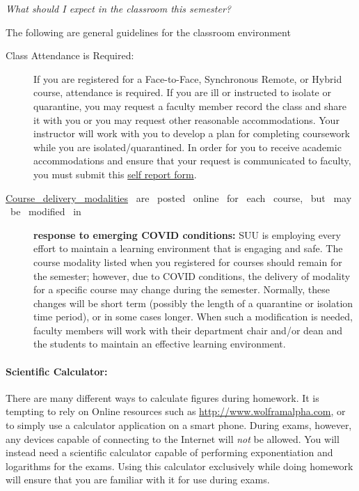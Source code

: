 \documentclass[12pt, letterpaper]{article}
\begin{document}
\noindent\emph{What should I expect in the classroom this semester?}

\noindent The following are general guidelines for the classroom environment
\begin{description}
	\item[Class Attendance is Required:] If you are registered for a Face-to-Face, Synchronous Remote, or Hybrid course, attendance is required. If you are ill or instructed to isolate or quarantine, you may request a faculty member record the class and share it with you or you may request other reasonable accommodations. Your instructor will work with you to develop a plan for completing coursework while you are isolated/quarantined. In order for you to receive academic accommodations and ensure that your request is communicated to faculty, you must submit this \href{https://my.suu.edu/covid/selfreport/}{self report form}.
	\item[\href{https://www.suu.edu/registrar/onlinehybrid.html}{Course ~delivery ~modalities} ~are ~posted ~online ~for ~each ~course, ~but ~may ~be ~modified ~in] \textbf{response to emerging COVID conditions:} SUU is employing every effort to maintain a learning environment that is engaging and safe. The course modality listed when you registered for courses should remain for the semester; however, due to COVID conditions, the delivery of modality for a specific course may change during the semester. Normally, these changes will be short term (possibly the length of a quarantine or isolation time period), or in some cases longer. When such a modification is needed, faculty members will work with their department chair and/or dean and the students to maintain an effective learning environment.
\end{description}

\paragraph{Scientific Calculator:}
There are many different ways to calculate figures during homework. It is tempting to rely on Online resources such as \href{http://www.wolframalpha.com}{http://www.wolframalpha.com}, or to simply use a calculator application on a smart phone. During exams, however, any devices capable of connecting to the Internet will \emph{not} be allowed. You will instead need a scientific calculator capable of performing exponentiation and logarithms for the exams. Using this calculator exclusively while doing homework will ensure that you are familiar with it for use during exams.
\end{document}
